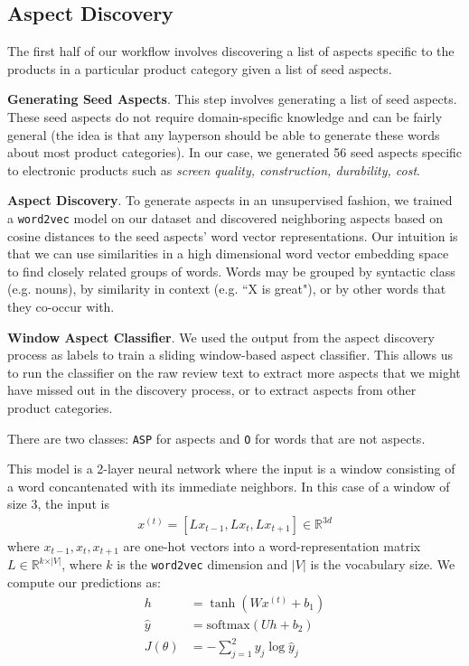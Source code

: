 \documentclass{article} %
\begin{document}
\subsection{Aspect Discovery}
The first half of our workflow involves discovering a list of aspects specific to the products in a particular product category given a list of seed aspects.

\textbf{Generating Seed Aspects}. This step involves generating a list of seed aspects. These seed aspects do not require domain-specific knowledge and can be fairly general (the idea is that any layperson should be able to generate these words about most product categories). In our case, we generated 56 seed aspects specific to electronic products such as \textit{screen quality, construction, durability, cost}. 

\textbf{Aspect Discovery}. To generate aspects in an unsupervised fashion, we trained a \texttt{word2vec} model on our dataset and discovered neighboring aspects based on cosine distances to the seed aspects' word vector representations. Our intuition is that we can use similarities in a high dimensional word vector embedding space to find closely related groups of words. Words may be grouped by syntactic class (e.g. nouns), by similarity in context (e.g. ``X is great"), or by other words that they co-occur with.

\textbf{Window Aspect Classifier}. We used the output from the aspect discovery process as labels to train a sliding window-based aspect classifier. This allows us to run the classifier on the raw review text to extract more aspects that we might have missed out in the discovery process, or to extract aspects from other product categories.

There are two classes: \texttt{ASP} for aspects and \texttt{O} for words that are not aspects.

This model is a 2-layer neural network where the input is a window consisting of a word concantenated with its immediate neighbors. In this case of a window of size 3, the input is
\begin{align}
x^{(t)} = [ L x_{t-1}, L x_t, L x_{t+1} ] \in \mathbb{R}^{3d}
\end{align}
where $x_{t-1}, x_t, x_{t+1}$ are one-hot vectors into a word-representation matrix $L \in \mathbb{R}^{k \times \vert V \vert}$, where $k$ is the \texttt{word2vec} dimension and $\vert V \vert$ is the vocabulary size. We compute our predictions as:
\begin{align}
h &= \tanh(W x^{(t)} + b_1)\\
\hat{y} &= \text{softmax} (Uh + b_2)\\
J(\theta) &= -\sum_{j=1}^{2} y_j \log \hat{y}_j
\end{align}
\end{document}
